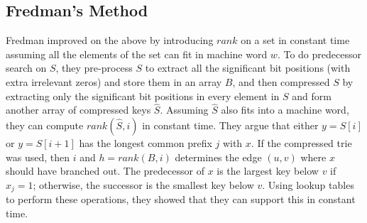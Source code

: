 \subsection{Fredman's Method}
Fredman \cite{FREDMAN1993424} improved on the above by introducing $rank$ on a set in constant time assuming all the elements of the set can fit in machine word $w$. To do predecessor search on $S$, they pre-process $S$ to extract all the significant bit positions (with extra irrelevant zeros) and store them in an array $B$, and then compressed $S$ by extracting only the significant bit positions in every element in $S$ and form another array of compressed keys $\hat{S}$. Assuming $\hat{S}$ also fits into a machine word, they can compute $rank(\hat{S}, i)$ in constant time. They argue that either $y = S[i]$ or $y = S[i+1]$ has the longest common prefix $j$ with $x$. If the compressed trie was used, then $i$ and $h = rank(B, i)$ determines the edge $(u, v)$ where $x$ should have branched out. The predecessor of $x$ is the largest key below $v$ if $x_j = 1$; otherwise, the successor is the smallest key below $v$. Using lookup tables to perform these operations, they showed that they can support this in constant time.

